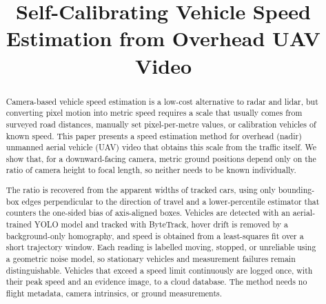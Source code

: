 \documentclass[conference]{IEEEtran}
\begin{document}
\title{Self-Calibrating Vehicle Speed Estimation from Overhead UAV Video}

\author{
}

\maketitle

\begin{abstract}
Camera-based vehicle speed estimation is a low-cost alternative to radar and lidar, but converting pixel motion into metric speed requires a scale that usually comes from surveyed road distances, manually set pixel-per-metre values, or calibration vehicles of known speed. This paper presents a speed estimation method for overhead (nadir) unmanned aerial vehicle (UAV) video that obtains this scale from the traffic itself. We show that, for a downward-facing camera, metric ground positions depend only on the ratio of camera height to focal length, so neither needs to be known individually.

The ratio is recovered from the apparent widths of tracked cars, using only bounding-box edges perpendicular to the direction of travel and a lower-percentile estimator that counters the one-sided bias of axis-aligned boxes. Vehicles are detected with an aerial-trained YOLO model and tracked with ByteTrack, hover drift is removed by a background-only homography, and speed is obtained from a least-squares fit over a short trajectory window. Each reading is labelled moving, stopped, or unreliable using a geometric noise model, so stationary vehicles and measurement failures remain distinguishable. Vehicles that exceed a speed limit continuously are logged once, with their peak speed and an evidence image, to a cloud database. The method needs no flight metadata, camera intrinsics, or ground measurements.
\end{abstract}
\end{document}
